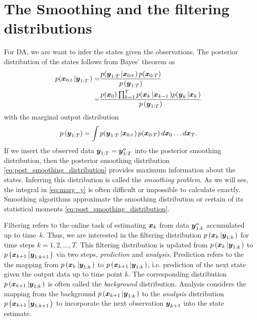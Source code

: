 \documentclass[10pt,a4paper, twocolumn]{article}
\renewcommand{\vec}[1]{{\mbox{\mathversion{bold}\ensuremath{#1}}}}
\begin{document}
\section{The Smoothing and the filtering distributions}
For DA, we are want to infer the states given the observations. The posterior distribution of the states follows from Bayes' theorem as 
\begin{align}\label{eq:post_smoothing_distribution}
 p(\vec{x}_{0:t}\left|\vec{y}_{1:T} \right.)=& \frac{p(\vec{y}_{1:T}\left|\vec{x}_{0:t} \right.)\, p(\vec{x}_{0:T}) }{p\left(\vec{y}_{1:T}\right)} \\
=& \frac{p(\vec{x}_0) \prod_{k=1}^T p(\vec{x}_{k}\left|\vec{x}_{k-1} \right.) p(\vec{y}_{k}\left|\vec{x}_{k}\right.)}{p\left(\vec{y}_{1:T}\right)}
\end{align}
%
with the marginal output distribution
\begin{equation}
p\left(\vec{y}_{1:T}\right) = \int p(\vec{y}_{1:T}\left|\vec{x}_{0:t} \right.)\, p(\vec{x}_{0:T}) \, d\vec{x}_0  \ldots d\vec{x}_T .\label{eq:marg_y}
\end{equation}
If we insert the observed data  $\vec{y}_{1:T}= \vec{y}^o_{1:T}$ into the posterior smoothing distribution, then the 
posterior smoothing distribution \eqref{eq:post_smoothing_distribution} provides maximum information about the states. Inferring this distribution is called the {\em smoothing problem}. As we will see, the
integral in \eqref{eq:marg_y} is often difficult or impossible to calculate exactly. Smoothing algorithms approximate the smoothing distribution or certain of its statistical moments \eqref{eq:post_smoothing_distribution}.

Filtering refers to the online task of estimating $\vec{x}_k$ from data $\vec{y}^o_{1:k}$ accumulated up to time~$k$. Thus, we are interested in the filtering distribution $p\left(\vec{x}_k\left|\vec{y}_{1:k}\right.\right)$ for time steps $k=1,2,\ldots, T$. This filtering distribution is updated from  $p\left(\vec{x}_k\left|\vec{y}_{1:k}\right.\right)$ to $p\left(\vec{x}_{k+1}\left|\vec{y}_{1:k+1}\right.\right)$ via two steps, {\em prediction} and {\em analysis}.  Prediction refers to the the mapping from $p\left(\vec{x}_{k}\left|\vec{y}_{1:k}\right.\right)$ to $p\left(\vec{x}_{k+1}\left|\vec{y}_{1:k}\right.\right)$, i.e. prediction of the next state given the output data up to time point $k$. The corresponding distribution $p\left(\vec{x}_{k+1}\left|\vec{y}_{1:k}\right.\right)$ is often called the {\em background} distribution. Analysis considers the mapping from the background $p\left(\vec{x}_{k+1}\left|\vec{y}_{1:k}\right.\right)$ to the {\em analysis} distribution $p\left(\vec{x}_{k+1}\left|\vec{y}_{1:k+1}\right.\right)$ to incorporate the next observation $\vec{y}_{k+1}$ into the state estimate. 
\end{document}
